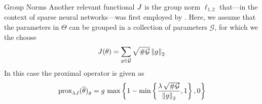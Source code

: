 %
%
\begin{example}{Group Norms}{}
	Another relevant functional $J$ is the group norm $\ell_{1,2}$ that---in the context of sparse neural networks---was first employed by \cite{scardapane2017group}. Here, we assume that the parameters in $\Theta$ can be grouped in a collection of parameters $\mathcal{G}$, for which we the choose
	\begin{align*}
		J(\theta) = \sum_{g\in\mathcal{G}} \sqrt{\# \mathcal{G}} \left\|g\right\|_2
	\end{align*}
	In this case the proximal operator is given as
	\begin{align*}
		\,\mathrm{prox}_{\lambda J}(\overline\theta)_g = g \, 
		\max\left\{1- \min\left\{
		\frac{\lambda\,\sqrt{\# \mathcal{G}}}{\left\|g\right\|_2}
		,1 \right\}
		,0\right\}
	\end{align*}
\end{example}
%
%
%
%
%
%
